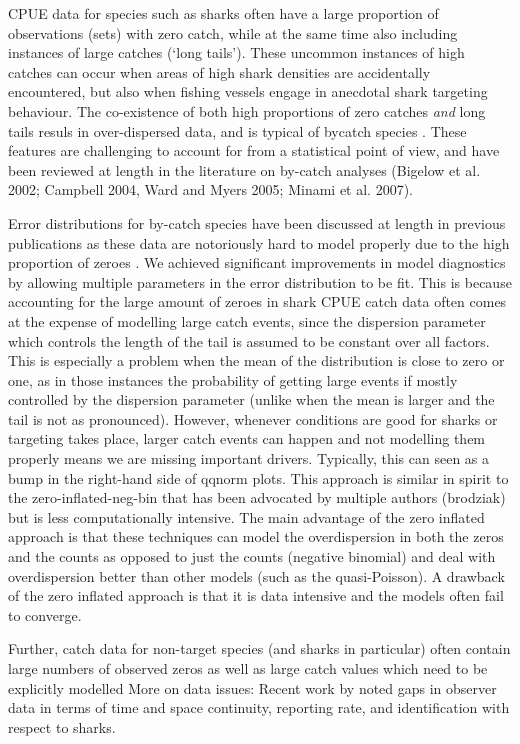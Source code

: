 CPUE data for species such as sharks often have a large proportion of observations (sets) with zero catch, while at the same time also including instances of large catches (`long tails'). These uncommon instances of high catches can occur when areas of high shark densities are accidentally encountered, but also when fishing vessels engage in anecdotal shark targeting behaviour. The co-existence of both high proportions of zero catches \emph{and} long tails resuls in over-dispersed data, and is typical of bycatch species \citep{Ward2005_a}. These features are challenging to account for from a statistical point of view, and have been reviewed at length in the literature on by-catch analyses (Bigelow et al.  2002; Campbell  2004, Ward and Myers  2005; Minami et al. 2007).

Error distributions for by-catch species have been discussed at length in previous publications as these data are notoriously hard to model properly due to the high proportion of zeroes \citep{...}. We achieved significant improvements in model diagnostics by allowing multiple parameters in the error distribution to be fit. This is because accounting for the large amount of zeroes in shark CPUE catch data often comes at the expense of modelling large catch events, since the dispersion parameter which controls the length of the tail is assumed to be constant over all factors. This is especially a problem when the mean of the distribution is close to zero or one, as in those instances the probability of getting large events if mostly controlled by the dispersion parameter (unlike when the mean is larger and the tail is not as pronounced). However, whenever conditions are good for sharks or targeting takes place, larger catch events can happen and not modelling them properly means we are missing important drivers. Typically, this can seen as a bump in the right-hand side of qqnorm plots.
This approach is similar in spirit to the zero-inflated-neg-bin that has been advocated by multiple authors (brodziak) but is less computationally intensive.
The main advantage of the zero inflated approach is that these techniques can model the overdispersion in both the zeros and the counts as opposed to just the counts (negative binomial) and deal with overdispersion better than other models (such as the quasi-Poisson). A drawback of the zero inflated approach is that it is data intensive and the models often fail to converge.

Further, catch data for non-target species (and sharks in particular) often contain large numbers of observed zeros as well as large catch values which need to be explicitly modelled 
More on data issues: Recent work by \citet{Clarke2011_a} noted gaps in observer data in terms of time and  space continuity, reporting rate, and identification with respect to sharks.

